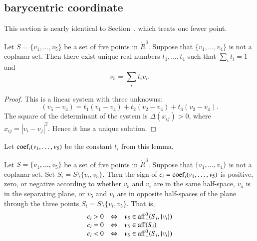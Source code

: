 \newpage
\subsection{barycentric coordinate}


This section is nearly identical to Section~, which treats one fewer point.

\begin{lemma}
Let $S=\{v_1,\ldots,v_5\}$ be
a set of five points in $\ring{R}^3$.  Suppose
that $\{v_1,\ldots,v_4\}$ is not a coplanar
set.    Then there exist unique real numbers
$t_1,\ldots,t_4$ such that $\sum_i t_i = 1$ and
	$$v_5 = \sum_i t_i v_i.$$
\end{lemma}

\begin{proof}  This is a linear system with
three unknowns:
	$$(v_5- v_4) = t_1 (v_1-v_4) +
		t_2 (v_2-v_4) + t_3 (v_3-v_4).
	$$
The
square of the
determinant of the system is
$\Delta(x_{ij}) >0$, where $x_{ij}=|v_i-v_j|^2$.
Hence it has a unique solution.
\end{proof}

\begin{definition}[coef]
Let ${\operatorname{coef}}_i(v_1,\ldots,v_5)$
be the constant $t_i$ from this lemma.
\end{definition}

\newpage


\begin{lemma}
Let $S=\{v_1,\ldots,v_5\}$ be
a set of five points in $\ring{R}^3$.  Suppose
that $\{v_1,\ldots,v_4\}$ is not a coplanar
set.  Set $S_i=S\setminus \{v_i,v_5\}$. Then the sign of 
$c_i={\operatorname{coef}}_i(v_1,\ldots,v_5)$ is positive,
zero, or negative according to whether $v_5$
and $v_i$ are in the same half-space, $v_5$
is in the separating plane, or $v_5$ and $v_i$
are in opposite half-spaces of the plane
through the three points $S_i=S\setminus\{v_i,v_5\}$.
That is,
  $$
  \begin{array}{lll}
   c_i > 0 &\Leftrightarrow   &v_5\in{\operatorname{aff}}_+^0(S_i,\{v_i\})\\
   c_i = 0 &\Leftrightarrow   &v_5\in{\operatorname{aff}}(S_i)\\
   c_i < 0 &\Leftrightarrow   &v_5\in{\operatorname{aff}}_-^0(S_i,\{v_i\})\\
    \end{array}
  $$
\end{lemma}

